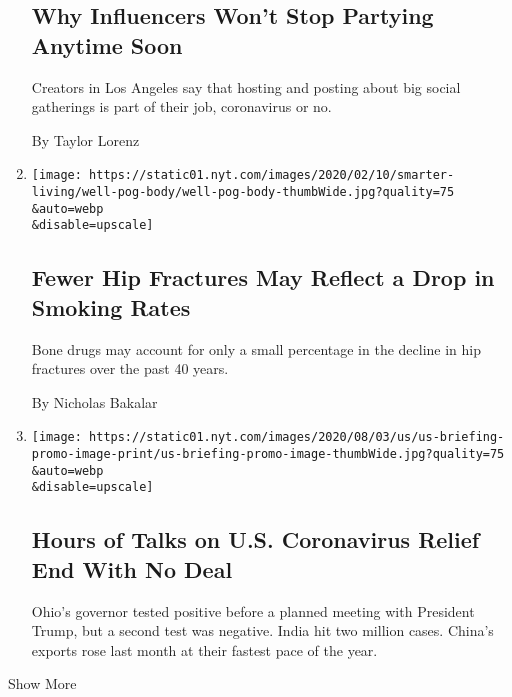 \begin{enumerate}
{  \subsection{Why Influencers Won't Stop Partying Anytime
  Soon}\label{why-influencers-wont-stop-partying-anytime-soon}}

  Creators in Los Angeles say that hosting and posting about big social
  gatherings is part of their job, coronavirus or no.

  By Taylor Lorenz
\item
  \href{/2020/08/06/well/live/fewer-hip-fractures-may-reflect-a-drop-in-smoking-rates.html}{}

  \texttt{[image: https://static01.nyt.com/images/2020/02/10/smarter-living/well-pog-body/well-pog-body-thumbWide.jpg?quality=75\\\&auto=webp\\\&disable=upscale]}

  \hypertarget{fewer-hip-fractures-may-reflect-a-drop-in-smoking-rates}{%
  \subsection{Fewer Hip Fractures May Reflect a Drop in Smoking
  Rates}\label{fewer-hip-fractures-may-reflect-a-drop-in-smoking-rates}}

  Bone drugs may account for only a small percentage in the decline in
  hip fractures over the past 40 years.

  By Nicholas Bakalar
\item
  \href{/2020/08/06/world/coronavirus-covid.html}{}

  \texttt{[image: https://static01.nyt.com/images/2020/08/03/us/us-briefing-promo-image-print/us-briefing-promo-image-thumbWide.jpg?quality=75\\\&auto=webp\\\&disable=upscale]}

  \hypertarget{hours-of-talks-on-us-coronavirus-relief-end-with-no-deal}{%
  \subsection{Hours of Talks on U.S. Coronavirus Relief End With No
  Deal}\label{hours-of-talks-on-us-coronavirus-relief-end-with-no-deal}}

  Ohio's governor tested positive before a planned meeting with
  President Trump, but a second test was negative. India hit two million
  cases. China's exports rose last month at their fastest pace of the
  year.
\end{enumerate}

Show More

